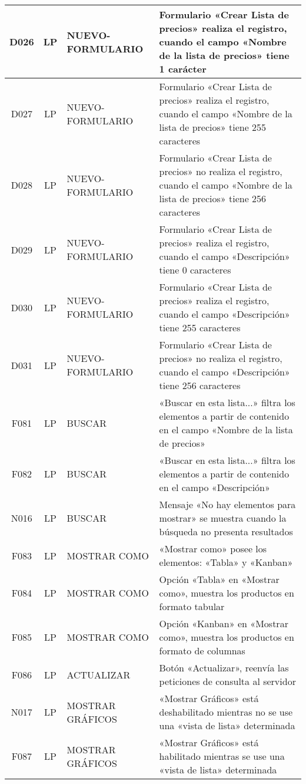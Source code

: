 \begin{landscape}
{\begin{longtable}[htb]{|c|c|p{5.0cm}|p{14.0cm}|}
D026 & LP & NUEVO-FORMULARIO & Formulario «Crear Lista de precios» realiza el registro, cuando el campo «Nombre de la lista de precios» tiene 1 carácter \\ \hline
D027 & LP & NUEVO-FORMULARIO & Formulario «Crear Lista de precios» realiza el registro, cuando el campo «Nombre de la lista de precios» tiene 255 caracteres \\ \hline
D028 & LP & NUEVO-FORMULARIO & Formulario «Crear Lista de precios» no realiza el registro, cuando el campo «Nombre de la lista de precios» tiene 256 caracteres \\ \hline
D029 & LP & NUEVO-FORMULARIO & Formulario «Crear Lista de precios» realiza el registro, cuando el campo «Descripción» tiene 0 caracteres \\ \hline
D030 & LP & NUEVO-FORMULARIO & Formulario «Crear Lista de precios» realiza el registro, cuando el campo «Descripción» tiene 255 caracteres \\ \hline
D031 & LP & NUEVO-FORMULARIO & Formulario «Crear Lista de precios» no realiza el registro, cuando el campo «Descripción» tiene 256 caracteres \\ \hline
F081 & LP & BUSCAR & «Buscar en esta lista...» filtra los elementos a partir de contenido en el campo «Nombre de la lista de precios» \\ \hline
F082 & LP & BUSCAR & «Buscar en esta lista...» filtra los elementos a partir de contenido en el campo «Descripción» \\ \hline
N016 & LP & BUSCAR & Mensaje «No hay elementos para mostrar» se muestra cuando la búsqueda no presenta resultados \\ \hline
F083 & LP & MOSTRAR COMO & «Mostrar como» posee los elementos: «Tabla» y «Kanban» \\ \hline
F084 & LP & MOSTRAR COMO & Opción «Tabla» en «Mostrar como», muestra los productos en formato tabular \\ \hline
F085 & LP & MOSTRAR COMO & Opción «Kanban» en «Mostrar como», muestra los productos en formato de columnas \\ \hline
F086 & LP & ACTUALIZAR & Botón «Actualizar», reenvía las peticiones de consulta al servidor \\ \hline
N017 & LP & MOSTRAR GRÁFICOS & «Mostrar Gráficos» está deshabilitado mientras no se use una «vista de lista» determinada \\ \hline
F087 & LP & MOSTRAR GRÁFICOS & «Mostrar Gráficos» está habilitado mientras se use una «vista de lista» determinada \\ \hline

\end{longtable}}
\end{landscape}
